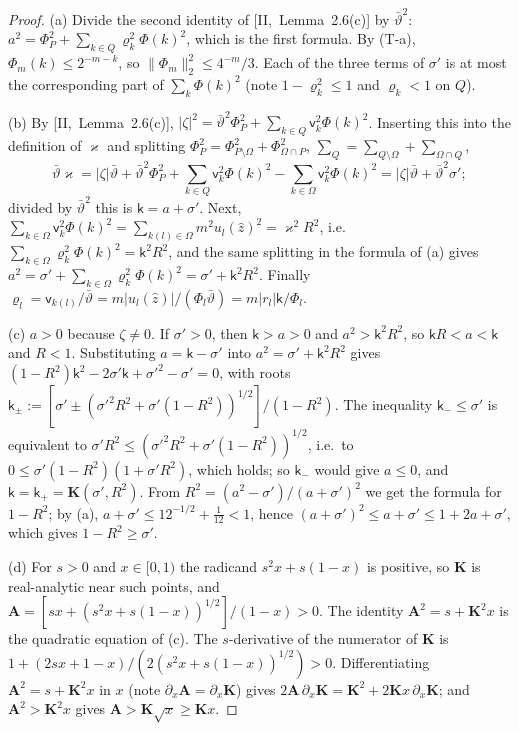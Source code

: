 \documentclass[10pt]{amsart}
\theoremstyle{definition}
\theoremstyle{remark}
\newcommand{\zh}{\hat z}
\begin{document}
\begin{proof}
(a) Divide the second identity of [II,~Lemma~2.6(c)] by $\bar\vartheta^2$:
$a^2=\Phi_P^2+\sum_{k\in Q}\varrho_k^2\Phi(k)^2$, which is the first formula.
By (T-a), $\Phi_m(k)\le2^{-m-k}$, so $\|\Phi_m\|_2^2\le4^{-m}/3$.  Each of the
three terms of $\sigma'$ is at most the corresponding part of
$\sum_k\Phi(k)^2$ (note $1-\varrho_k^2\le1$ and $\varrho_k<1$ on $Q$).

(b) By [II,~Lemma~2.6(c)], $|\zeta|^2=\bar\vartheta^2\Phi_P^2+\sum_{k\in Q}
\mathsf v_k^2\Phi(k)^2$.  Inserting this into the definition of $\varkappa$ and
splitting $\Phi_P^2=\Phi_{P\setminus\Omega}^2+\Phi_{\Omega\cap P}^2$,
$\sum_Q=\sum_{Q\setminus\Omega}+\sum_{\Omega\cap Q}$,
\[
 \bar\vartheta\varkappa=|\zeta|\bar\vartheta+\bar\vartheta^2\Phi_P^2+\sum_{k\in Q}
 \mathsf v_k^2\Phi(k)^2-\sum_{k\in\Omega}\mathsf v_k^2\Phi(k)^2
 =|\zeta|\bar\vartheta+\bar\vartheta^2\sigma' ;
\]
divided by $\bar\vartheta^2$ this is $\mathsf k=a+\sigma'$.  Next,
$\sum_{k\in\Omega}\mathsf v_k^2\Phi(k)^2=\sum_{k(l)\in\Omega}m^2u_l(\zh)^2=
\varkappa^2R^2$, i.e.\ $\sum_{k\in\Omega}\varrho_k^2\Phi(k)^2=\mathsf k^2R^2$, and
the same splitting in the formula of (a) gives $a^2=\sigma'+\sum_{k\in
\Omega}\varrho_k^2\Phi(k)^2=\sigma'+\mathsf k^2R^2$.  Finally $\varrho_l=
\mathsf v_{k(l)}/\bar\vartheta=m|u_l(\zh)|/(\Phi_l\bar\vartheta)=m|r_l|\mathsf k/
\Phi_l$.

(c) $a>0$ because $\zeta\ne0$.  If $\sigma'>0$, then $\mathsf k>a>0$ and
$a^2>\mathsf k^2R^2$, so $\mathsf kR<a<\mathsf k$ and $R<1$.  Substituting
$a=\mathsf k-\sigma'$ into $a^2=\sigma'+\mathsf k^2R^2$ gives $(1-R^2)\mathsf k^2-
2\sigma'\mathsf k+\sigma'^2-\sigma'=0$, with roots $\mathsf k_\pm:=[\sigma'\pm
(\sigma'^2R^2+\sigma'(1-R^2))^{1/2}]/(1-R^2)$.  The inequality $\mathsf k_-\le
\sigma'$ is equivalent to $\sigma'R^2\le(\sigma'^2R^2+\sigma'(1-R^2))^{1/2}$, i.e.\
to $0\le\sigma'(1-R^2)(1+\sigma'R^2)$, which holds; so $\mathsf k_-$ would give
$a\le0$, and $\mathsf k=\mathsf k_+=\mathbf K(\sigma',R^2)$.  From $R^2=(a^2-
\sigma')/(a+\sigma')^2$ we get the formula for $1-R^2$; by (a), $a+\sigma'\le
12^{-1/2}+\frac1{12}<1$, hence $(a+\sigma')^2\le a+\sigma'\le1+2a+\sigma'$, which
gives $1-R^2\ge\sigma'$.

(d) For $s>0$ and $x\in[0,1)$ the radicand $s^2x+s(1-x)$ is positive, so
$\mathbf K$ is real-analytic near such points, and $\mathbf A=[sx+(s^2x+
s(1-x))^{1/2}]/(1-x)>0$.  The identity $\mathbf A^2=s+\mathbf K^2x$ is the
quadratic equation of (c).  The $s$-derivative of the numerator of $\mathbf
K$ is $1+(2sx+1-x)/(2(s^2x+s(1-x))^{1/2})>0$.  Differentiating $\mathbf A^2=s+
\mathbf K^2x$ in $x$ (note $\partial_x\mathbf A=\partial_x\mathbf K$) gives
$2\mathbf A\,\partial_x\mathbf K=\mathbf K^2+2\mathbf Kx\,\partial_x\mathbf K$;
and $\mathbf A^2>\mathbf K^2x$ gives $\mathbf A>\mathbf K\sqrt x\ge\mathbf Kx$.


\end{proof}
\end{document}
